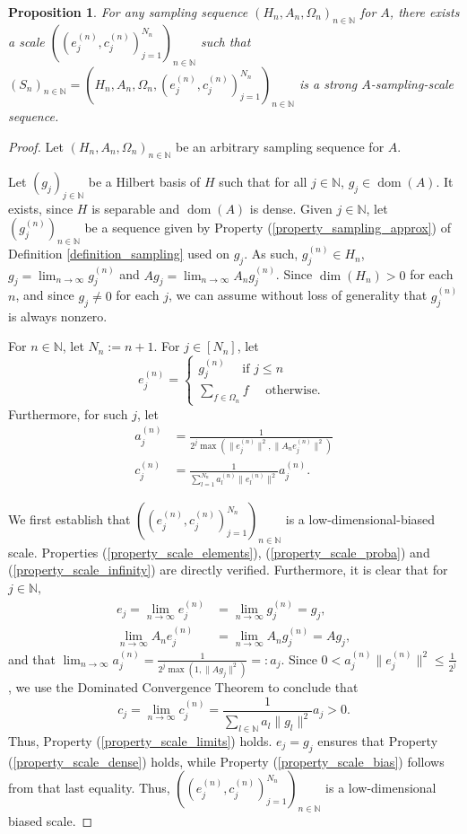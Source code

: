 \documentclass{amsart}
\newtheorem{prop}[thm]{Proposition}
\theoremstyle{definition}
\theoremstyle{remark}
\begin{document}
\begin{prop}\label{proposition_scale_existence}
	For any sampling sequence $(H_n,A_n,\Omega_n)_{n\in\mathbb{N}}$ for $A$, there exists a scale $((e_j^{(n)},c_j^{(n)})_{j=1}^{N_n})_{n\in\mathbb{N}}$ such that $(S_n)_{n\in\mathbb{N}}=(H_n,A_n,\Omega_n,(e_j^{(n)},c_j^{(n)})_{j=1}^{N_n})_{n\in\mathbb{N}}$ is a strong $A$-sampling-scale sequence.
\end{prop}
\begin{proof}
	Let $(H_n,A_n,\Omega_n)_{n\in\mathbb{N}}$ be an arbitrary sampling sequence for $A$.
	
	Let $(g_j)_{j\in\mathbb{N}}$ be a Hilbert basis of $H$ such that for all $j\in\mathbb{N}$, $g_j\in\operatorname{dom}(A)$. It exists, since $H$ is separable and $\operatorname{dom}(A)$ is dense. Given $j\in\mathbb{N}$, let $(g_j^{(n)})_{n\in\mathbb{N}}$ be a sequence given by Property (\ref{property_sampling_approx}) of Definition \ref{definition_sampling} used on $g_j$. As such, $g_j^{(n)}\in H_n$, $g_j=\lim_{n\rightarrow\infty}g_j^{(n)}$ and $Ag_j=\lim_{n\rightarrow\infty}A_ng_j^{(n)}$. Since $\dim(H_n)>0$ for each $n$, and since $g_j\neq 0$ for each $j$, we can assume without loss of generality that $g_j^{(n)}$ is always nonzero. 
	
	For $n\in\mathbb{N}$, let $N_n:=n+1$. For $j\in[N_n]$, let $$e_j^{(n)}=\begin{cases}g_j^{(n)} \quad \text{ if } j\leq n\\\sum_{f\in\Omega_n}f \quad \text{ otherwise. }\end{cases}$$ 
	Furthermore, for such $j$, let 
	\begin{align*}
		a_j^{(n)}&=\frac{1}{2^j\max\left(\|e_j^{(n)}\|^2,\|A_n e_j^{(n)}\|^2\right)}\\
		c_j^{(n)}&=\frac{1}{\sum_{l=1}^{N_n}a_l^{(n)}\|e_l^{(n)}\|^2}a_j^{(n)}.	
	\end{align*}
	
	
	
	We first establish that $((e_j^{(n)},c_j^{(n)})_{j=1}^{N_n})_{n\in\mathbb{N}}$ is a low-dimensional-biased scale. Properties (\ref{property_scale_elements}), (\ref{property_scale_proba}) and (\ref{property_scale_infinity}) are directly verified. Furthermore, it is clear that for $j\in\mathbb{N},$ \begin{align*}e_j=\lim_{n\rightarrow\infty}e_j^{(n)}&=\lim_{n\rightarrow\infty}g_j^{(n)}=g_j,\\ \lim_{n\rightarrow\infty}A_ne_j^{(n)}&=\lim_{n\rightarrow\infty}A_ng_j^{(n)}=Ag_j,
	\end{align*} 
	and that $\lim_{n\rightarrow\infty}a_j^{(n)}=\frac{1}{2^j\max(1,\|Ag_j\|^2)}=:a_j.$ Since $0<a_j^{(n)}\|e_j^{(n)}\|^2\leq\frac{1}{2^j}$, we use the Dominated Convergence Theorem to conclude that $$c_j=\lim_{n\rightarrow\infty}c_j^{(n)}=\frac{1}{\sum_{l\in\mathbb{N}}a_l\|g_l\|^2}a_j>0.$$ Thus, Property (\ref{property_scale_limits}) holds. $e_j=g_j$ ensures that Property (\ref{property_scale_dense}) holds, while Property (\ref{property_scale_bias}) follows from that last equality. Thus, $((e_j^{(n)},c_j^{(n)})_{j=1}^{N_n})_{n\in\mathbb{N}}$ is a low-dimensional biased scale.
	

\end{proof}
\end{document}
